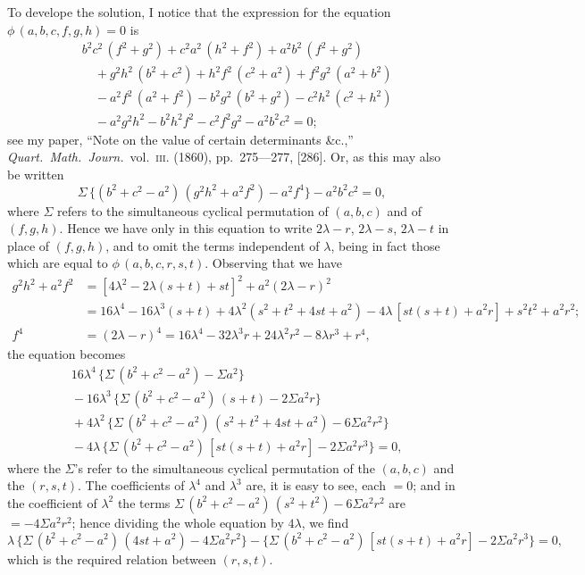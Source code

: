 \documentclass[11pt,a4paper]{article}
\begin{document}
To develope the solution, I notice that the expression for the equation $\phi\,(a, b, c, f, g, h)=0$ is
\begin{align*}
&b^2c^2\,(f^2+g^2) + c^2a^2\,(h^2+f^2) + a^2b^2\,(f^2+g^2)\\
&\quad{}+ g^2h^2\,(b^2+c^2) + h^2f^2\,(c^2+a^2) + f^2g^2\,(a^2+b^2)\\
&\quad{}- a^2f^2\,(a^2+f^2) - b^2g^2\,(b^2+g^2) - c^2h^2\,(c^2+h^2)\\
&\quad{}- a^2g^2h^2 - b^2h^2f^2 - c^2f^2g^2 - a^2b^2c^2 = 0;
\end{align*}
see my paper, ``Note on the value of certain determinants \&c.,'' \textit{Quart.\ Math.\ Journ.}\
vol.~\textsc{iii}. (1860), pp.\ 275---277, [286]. Or, as this may also be written
\[
\Sigma\,\{(b^2+c^2-a^2)\,(g^2h^2+a^2f^2) - a^2f^4\} - a^2b^2c^2 = 0,
\]
where $\Sigma$ refers to the simultaneous cyclical permutation of $(a, b, c)$ and of $(f, g, h)$.
Hence we have only in this equation to write $2\lambda-r$, $2\lambda-s$, $2\lambda-t$ in place of
$(f, g, h)$, and to omit the terms independent of $\lambda$, being in fact those which are equal
to $\phi\,(a, b, c, r, s, t)$. Observing that we have
\begin{align*}
g^2h^2+a^2f^2 &= [4\lambda^2-2\lambda(s+t)+st]^2 + a^2(2\lambda-r)^2\\
&= 16\lambda^4 - 16\lambda^3(s+t) + 4\lambda^2(s^2+t^2+4st+a^2) - 4\lambda\,[st(s+t)+a^2r] + s^2t^2+a^2r^2;\\
f^4 &= (2\lambda-r)^4 = 16\lambda^4 - 32\lambda^3r + 24\lambda^2r^2 - 8\lambda r^3 + r^4,
\end{align*}
the equation becomes
\begin{align*}
&16\lambda^4\,\{\Sigma\,(b^2+c^2-a^2) - \Sigma a^2\}\\
&{}- 16\lambda^3\,\{\Sigma\,(b^2+c^2-a^2)\,(s+t) - 2\Sigma a^2r\}\\
&{}+ 4\lambda^2\,\{\Sigma\,(b^2+c^2-a^2)\,(s^2+t^2+4st+a^2) - 6\Sigma a^2r^2\}\\
&{}- 4\lambda\,\{\Sigma\,(b^2+c^2-a^2)\,[st(s+t)+a^2r] - 2\Sigma a^2r^3\} = 0,
\end{align*}
where the $\Sigma$'s refer to the simultaneous cyclical permutation of the $(a, b, c)$ and the
$(r, s, t)$. The coefficients of $\lambda^4$ and $\lambda^3$ are, it is easy to see, each $=0$; and in the
coefficient of $\lambda^2$ the terms $\Sigma\,(b^2+c^2-a^2)\,(s^2+t^2) - 6\Sigma a^2r^2$ are $=-4\Sigma a^2r^2$; hence dividing
the whole equation by $4\lambda$, we find
\[
\lambda\,\{\Sigma\,(b^2+c^2-a^2)\,(4st+a^2) - 4\Sigma a^2r^2\} - \{\Sigma\,(b^2+c^2-a^2)\,[st(s+t)+a^2r] - 2\Sigma a^2r^3\} = 0,
\]
which is the required relation between $(r, s, t)$.
\end{document}
